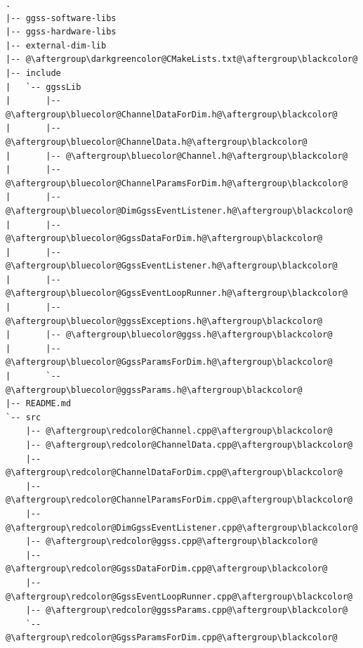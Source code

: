 \begin{multicols*}{2}[]
\begin{lstlisting}[title={(a) Nowa struktura biblioteki \textbf{ggss-lib}}, label={lst:newLibStructure}, escapechar=@]
.
|-- ggss-software-libs
|-- ggss-hardware-libs
|-- external-dim-lib
|-- @\aftergroup\darkgreencolor@CMakeLists.txt@\aftergroup\blackcolor@
|-- include
|   `-- ggssLib
|       |-- @\aftergroup\bluecolor@ChannelDataForDim.h@\aftergroup\blackcolor@
|       |-- @\aftergroup\bluecolor@ChannelData.h@\aftergroup\blackcolor@
|       |-- @\aftergroup\bluecolor@Channel.h@\aftergroup\blackcolor@
|       |-- @\aftergroup\bluecolor@ChannelParamsForDim.h@\aftergroup\blackcolor@
|       |-- @\aftergroup\bluecolor@DimGgssEventListener.h@\aftergroup\blackcolor@
|       |-- @\aftergroup\bluecolor@GgssDataForDim.h@\aftergroup\blackcolor@
|       |-- @\aftergroup\bluecolor@GgssEventListener.h@\aftergroup\blackcolor@
|       |-- @\aftergroup\bluecolor@GgssEventLoopRunner.h@\aftergroup\blackcolor@
|       |-- @\aftergroup\bluecolor@ggssExceptions.h@\aftergroup\blackcolor@
|       |-- @\aftergroup\bluecolor@ggss.h@\aftergroup\blackcolor@
|       |-- @\aftergroup\bluecolor@GgssParamsForDim.h@\aftergroup\blackcolor@
|       `-- @\aftergroup\bluecolor@ggssParams.h@\aftergroup\blackcolor@
|-- README.md
`-- src
    |-- @\aftergroup\redcolor@Channel.cpp@\aftergroup\blackcolor@
    |-- @\aftergroup\redcolor@ChannelData.cpp@\aftergroup\blackcolor@
    |-- @\aftergroup\redcolor@ChannelDataForDim.cpp@\aftergroup\blackcolor@
    |-- @\aftergroup\redcolor@ChannelParamsForDim.cpp@\aftergroup\blackcolor@
    |-- @\aftergroup\redcolor@DimGgssEventListener.cpp@\aftergroup\blackcolor@
    |-- @\aftergroup\redcolor@ggss.cpp@\aftergroup\blackcolor@
    |-- @\aftergroup\redcolor@GgssDataForDim.cpp@\aftergroup\blackcolor@
    |-- @\aftergroup\redcolor@GgssEventLoopRunner.cpp@\aftergroup\blackcolor@
    |-- @\aftergroup\redcolor@ggssParams.cpp@\aftergroup\blackcolor@
    `-- @\aftergroup\redcolor@GgssParamsForDim.cpp@\aftergroup\blackcolor@

\end{lstlisting}

\vfill\null
\columnbreak


\end{multicols*}
